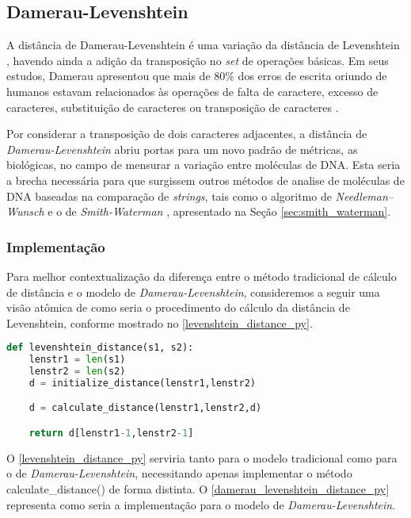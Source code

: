 \subsection{Damerau-Levenshtein} %
\label{sec:damerau_levenshtein}

A distância de Damerau-Levenshtein é uma variação da distância de Levenshtein \cite{levenshtein1965}, havendo ainda a adição da transposição no \textit{set} de operações básicas. Em seus estudos, Damerau apresentou que mais de $80\%$ dos erros de escrita oriundo de humanos estavam relacionados às operações de falta de caractere, excesso de caracteres, substituição de caracteres ou transposição de caracteres \cite{damerau1964technique}.


Por  considerar  a transposição de dois caracteres adjacentes, a distância de \textit{Damerau-Levenshtein} abriu portas para um novo padrão de métricas, as biológicas, no campo de mensurar a variação entre moléculas de DNA. Esta seria a brecha necessária para que surgissem outros métodos de analise de moléculas de DNA baseadas na comparação de \textit{strings}, tais como o algoritmo de \textit{Needleman–Wunsch} \cite{needleman1970general} e  o de \textit{Smith-Waterman} \cite{smith1981identification}, apresentado  na Seção \ref{sec:smith_waterman}.

\subsubsection{Implementação} %
\label{sub:implementa_damerau_levenshtein}

Para melhor contextualização da diferença entre o método tradicional de cálculo de distância e o modelo de \textit{Damerau-Levenshtein}, consideremos a seguir uma visão atômica de como seria o procedimento do cálculo da distância de Levenshtein, conforme mostrado no \autoref{levenshtein_distance_py}.

\begin{lstlisting}[language=Python,label=levenshtein_distance_py,caption={Visão atômica do cálculo da distância de Levenshtein}]
def levenshtein_distance(s1, s2):
    lenstr1 = len(s1)
    lenstr2 = len(s2)
    d = initialize_distance(lenstr1,lenstr2)

	d = calculate_distance(lenstr1,lenstr2,d) 

    return d[lenstr1-1,lenstr2-1]
\end{lstlisting}

O \autoref{levenshtein_distance_py} serviria tanto para o modelo tradicional como para o de \textit{Damerau-Levenshtein}, necessitando apenas implementar o método {\code calculate\_distance()} de forma distinta. O \autoref{damerau_levenshtein_distance_py} representa como seria a implementação para o modelo de \textit{Damerau-Levenshtein}.

